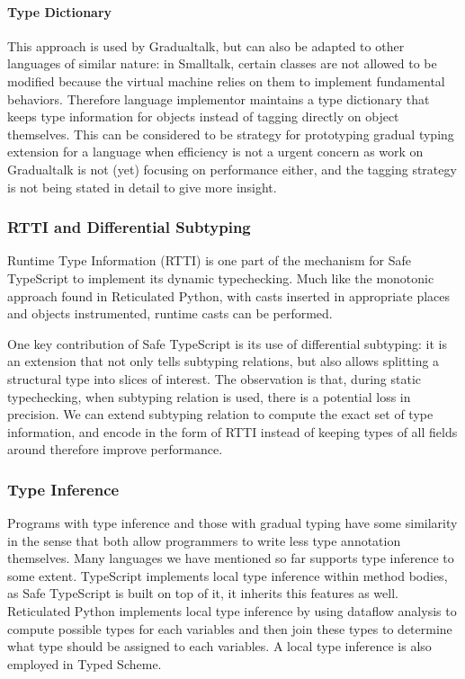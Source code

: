 \paragraph{Type Dictionary}

This approach is used by Gradualtalk, but can also be adapted to other languages of similar nature:
in Smalltalk, certain classes are not allowed to be modified because
the virtual machine relies on them to implement fundamental behaviors.
Therefore language implementor maintains a type dictionary that keeps type information for objects
instead of tagging directly on object themselves.
This can be considered to be strategy for prototyping gradual typing extension for a language when
efficiency is not a urgent concern as work on Gradualtalk is not (yet) focusing on performance either,
and the tagging strategy is not being stated in detail to give more insight.

\subsubsection{RTTI and Differential Subtyping}

Runtime Type Information (RTTI) is one part of the mechanism for Safe TypeScript
to implement its dynamic typechecking. Much like the monotonic approach found in Reticulated Python,
with casts inserted in appropriate places and objects instrumented, runtime casts can be performed.

One key contribution of Safe TypeScript is its use of differential subtyping:
it is an extension that not only tells subtyping relations, but also allows splitting
a structural type into slices of interest.
The observation is that, during static typechecking, when subtyping relation is used, there is a potential loss in precision. We can extend subtyping relation to compute the exact set of type information,
and encode in the form of RTTI instead of keeping types of all fields around therefore improve performance.

\subsubsection{Type Inference}

Programs with type inference and those with gradual typing have some similarity in the sense
that both allow programmers to write less type annotation themselves.
Many languages we have mentioned so far supports type inference to some extent.
TypeScript implements local type inference within method bodies,
as Safe TypeScript is built on top of it, it inherits this features as well.
Reticulated Python implements local type inference by
using dataflow analysis to compute possible types for each variables
and then join these types to determine what type should be assigned to each variables.
A local type inference is also employed in Typed Scheme.

